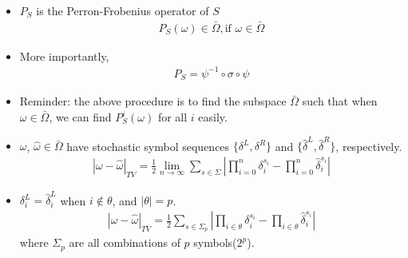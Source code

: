 \documentclass[12pt,t]{beamer}
\begin{document}
\begin{frame}
\begin{itemize}\setlength{\parskip}{0pt}  \setlength{\itemsep}{5pt} \setlength{\topsep}{0pt}

   \item $P_S$ is the Perron-Frobenius operator of $S$
         \begin{eqnarray}
         P_S (\omega) \in \bar{\Omega}, \mbox{if } \omega \in \bar{\Omega} \nonumber
         \end{eqnarray}
   \item More importantly,
         \begin{eqnarray}
         P_S= \psi^{-1}\circ \sigma \circ \psi  \nonumber
         \end{eqnarray}
   \item Reminder: the above procedure is to find the subspace $\bar{\Omega}$ such that when $\omega\in\bar{\Omega}$, we can find $P_S^i(\omega)$ for all $i$ easily.
\end{itemize}

\end{frame}
\begin{frame}
\begin{itemize}\setlength{\parskip}{0pt}  \setlength{\itemsep}{5pt} \setlength{\topsep}{0pt}
    \item $\omega$, $\hat{\omega}\in{\bar{\Omega}}$ have stochastic symbol sequences  $\{\delta^L, \delta^R\}$ and $\{\hat{\delta}^L,\hat{\delta}^R \}$, respectively.
          \begin{eqnarray}
            \label{infiniteTV}
            |\omega-\hat{\omega}|_{TV} = \frac{1}{2} \lim_{n \rightarrow \infty}  \sum_{s\in\Sigma} \left|
                                     \prod_{i=0}^n\delta_i^{s_i}-\prod_{i=0}^n\hat{\delta}_i^{s_i}  \right| \nonumber
          \end{eqnarray}
    \item $\delta_i^L = \hat{\delta}_i^L$ when $i\notin \theta$, and $|\theta| = p$.
          \begin{eqnarray}
           \label{finiteTV}
            |\omega-\hat{\omega}|_{TV} = \frac{1}{2} \sum_{s\in\Sigma_p}  \left|
                             \prod_{i\in \theta}\delta_i^{s_i}-\prod_{i\in\theta}\hat{\delta}_i^{s_i}  \right| \nonumber
          \end{eqnarray}
   where $\Sigma_p$ are all combinations of $p$ symbols($2^p$).
\end{itemize}

\end{frame}
\end{document}
